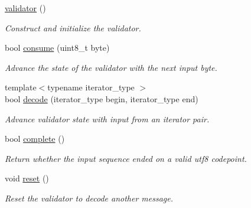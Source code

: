 \begin{DoxyCompactItemize}
\item 
\mbox{\label{classwebsocketpp_1_1utf8__validator_1_1validator_a41ea90fb7c6b34d41a8e6e71a6b04346}} 
\mbox{\hyperlink{classwebsocketpp_1_1utf8__validator_1_1validator_a41ea90fb7c6b34d41a8e6e71a6b04346}{validator}} ()
\begin{DoxyCompactList}\small\item\em Construct and initialize the validator. \end{DoxyCompactList}\item 
bool \mbox{\hyperlink{classwebsocketpp_1_1utf8__validator_1_1validator_ada7f6cdd4261d848d51d7ba0bd9d28b4}{consume}} (uint8\+\_\+t byte)
\begin{DoxyCompactList}\small\item\em Advance the state of the validator with the next input byte. \end{DoxyCompactList}\item 
{\footnotesize template$<$typename iterator\+\_\+type $>$ }\\bool \mbox{\hyperlink{classwebsocketpp_1_1utf8__validator_1_1validator_a2cde6cad6f1a0f66674010848ec80fba}{decode}} (iterator\+\_\+type begin, iterator\+\_\+type end)
\begin{DoxyCompactList}\small\item\em Advance validator state with input from an iterator pair. \end{DoxyCompactList}\item 
bool \mbox{\hyperlink{classwebsocketpp_1_1utf8__validator_1_1validator_a89deb3bdfd8b94da908b806e543491ba}{complete}} ()
\begin{DoxyCompactList}\small\item\em Return whether the input sequence ended on a valid utf8 codepoint. \end{DoxyCompactList}\item 
\mbox{\label{classwebsocketpp_1_1utf8__validator_1_1validator_a98aa3058213a650997bd832cc003da75}} 
void \mbox{\hyperlink{classwebsocketpp_1_1utf8__validator_1_1validator_a98aa3058213a650997bd832cc003da75}{reset}} ()
\begin{DoxyCompactList}\small\item\em Reset the validator to decode another message. \end{DoxyCompactList}\end{DoxyCompactItemize}


